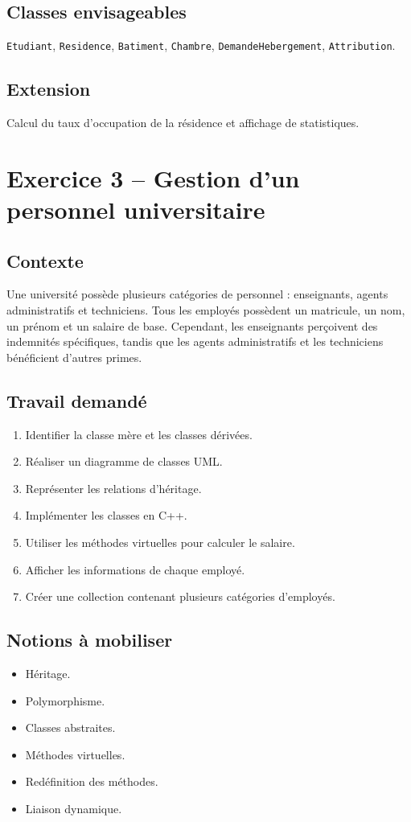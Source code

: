 \documentclass[12pt,a4paper]{article}
\begin{document}
\subsection{Classes envisageables}
\texttt{Etudiant}, \texttt{Residence}, \texttt{Batiment}, \texttt{Chambre}, \texttt{DemandeHebergement}, \texttt{Attribution}.

\subsection{Extension}
Calcul du taux d'occupation de la résidence et affichage de statistiques.

\newpage
\section{Exercice 3 -- Gestion d'un personnel universitaire}

\subsection{Contexte}
Une université possède plusieurs catégories de personnel : enseignants, agents administratifs et techniciens. Tous les employés possèdent un matricule, un nom, un prénom et un salaire de base. Cependant, les enseignants perçoivent des indemnités spécifiques, tandis que les agents administratifs et les techniciens bénéficient d'autres primes.

\subsection{Travail demandé}
\begin{enumerate}
  \item Identifier la classe mère et les classes dérivées.
  \item Réaliser un diagramme de classes UML.
  \item Représenter les relations d'héritage.
  \item Implémenter les classes en C++.
  \item Utiliser les méthodes virtuelles pour calculer le salaire.
  \item Afficher les informations de chaque employé.
  \item Créer une collection contenant plusieurs catégories d'employés.
\end{enumerate}

\subsection{Notions à mobiliser}
\begin{itemize}
  \item Héritage.
  \item Polymorphisme.
  \item Classes abstraites.
  \item Méthodes virtuelles.
  \item Redéfinition des méthodes.
  \item Liaison dynamique.
\end{itemize}
\end{document}

